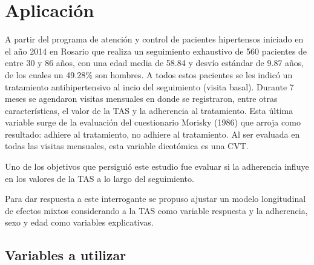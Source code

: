 \documentclass[spanish]{article}
\numberwithin{figure}{subsection}
\numberwithin{equation}{subsection}
\numberwithin{table}{subsection}
\def\npatients{560}
\begin{document}
\newpage

\section{Aplicación}

A partir del programa de atención y control de pacientes hipertensos iniciado en
el año 2014 en Rosario que realiza un seguimiento exhaustivo de \npatients{}
pacientes de entre 30 y 86 años, con una edad media de 58.84 y desvío estándar
de 9.87 años, de los cuales un 49.28\% son hombres. A todos estos pacientes se
les indicó un tratamiento antihipertensivo al incio del seguimiento (visita
basal). Durante 7 meses se agendaron visitas mensuales en donde se registraron,
entre otras características, el valor de la TAS y la adherencia al tratamiento.
Esta última variable surge de la evaluación del cuestionario Morisky (1986) que
arroja como resultado: adhiere al tratamiento, no adhiere al tratamiento. Al ser
evaluada en todas las visitas mensuales, esta variable dicotómica es una CVT.

Uno de los objetivos que persiguió este estudio fue evaluar si la adherencia
influye en los valores de la TAS a lo largo del seguimiento.

Para dar respuesta a este interrogante se propuso ajustar un modelo longitudinal
de efectos mixtos considerando a la TAS como variable respuesta y la adherencia,
sexo y edad como variables explicativas.

\subsection{Variables a utilizar}
\label{variables}
\end{document}
